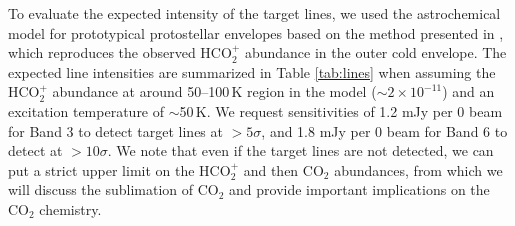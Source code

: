 \documentclass[12pt,a4paper]{article}  %
\newcommand{\carbondioxide}{CO$_2$\xspace}
\newcommand{\protonatedcarbondioxide}{HCO$_2^+$\xspace}
\begin{document}
To evaluate the expected intensity of the target lines, we used the astrochemical model for prototypical protostellar envelopes based on the method presented in \citet[][, Figure \ref{fig:protocore_cartoon}(b)]{Aikawa20}, which reproduces the observed \protonatedcarbondioxide abundance in the outer cold envelope. The expected line intensities are summarized in Table \ref{tab:lines} when assuming the \protonatedcarbondioxide abundance at around 50--100\,K region in the model ($\sim2\times10^{-11}$) and an excitation temperature of $\sim$50\,K. We request sensitivities of 1.2 mJy per 0 beam for Band 3 to detect target lines at $>5\sigma$, and 1.8 mJy per 0 beam for Band 6 to detect at $>10\sigma$. We note that even if the target lines are not detected, we can put a strict upper limit on the \protonatedcarbondioxide and then \carbondioxide abundances, from which we will discuss the sublimation of \carbondioxide and provide important implications on the \carbondioxide chemistry. 




\end{document}
